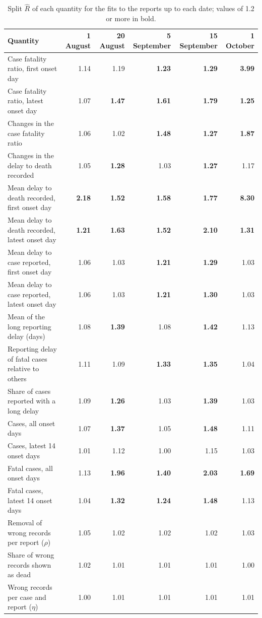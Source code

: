 \documentclass[11pt,a4paper]{article}
\begin{document}
\begin{table}[p]
\centering
\small
\begin{tabular}{lrrrrr}
\toprule
Quantity & 1 August & 20 August & 5 September & 15 September & 1 October\\
\midrule
Case fatality ratio, first onset day & 1.14 & 1.19 & \textbf{1.23} & \textbf{1.29} & \textbf{3.99} \\
Case fatality ratio, latest onset day & 1.07 & \textbf{1.47} & \textbf{1.61} & \textbf{1.79} & \textbf{1.25} \\
Changes in the case fatality ratio & 1.06 & 1.02 & \textbf{1.48} & \textbf{1.27} & \textbf{1.87} \\
Changes in the delay to death recorded & 1.05 & \textbf{1.28} & 1.03 & \textbf{1.27} & 1.17 \\
Mean delay to death recorded, first onset day & \textbf{2.18} & \textbf{1.52} & \textbf{1.58} & \textbf{1.77} & \textbf{8.30} \\
Mean delay to death recorded, latest onset day & \textbf{1.21} & \textbf{1.63} & \textbf{1.52} & \textbf{2.10} & \textbf{1.31} \\
Mean delay to case reported, first onset day & 1.06 & 1.03 & \textbf{1.21} & \textbf{1.29} & 1.03 \\
Mean delay to case reported, latest onset day & 1.06 & 1.03 & \textbf{1.21} & \textbf{1.30} & 1.03 \\
Mean of the long reporting delay (days) & 1.08 & \textbf{1.39} & 1.08 & \textbf{1.42} & 1.13 \\
Reporting delay of fatal cases relative to others & 1.11 & 1.09 & \textbf{1.33} & \textbf{1.35} & 1.04 \\
Share of cases reported with a long delay & 1.09 & \textbf{1.26} & 1.03 & \textbf{1.39} & 1.03 \\
Cases, all onset days & 1.07 & \textbf{1.37} & 1.05 & \textbf{1.48} & 1.11 \\
Cases, latest 14 onset days & 1.01 & 1.12 & 1.00 & 1.15 & 1.03 \\
Fatal cases, all onset days & 1.13 & \textbf{1.96} & \textbf{1.40} & \textbf{2.03} & \textbf{1.69} \\
Fatal cases, latest 14 onset days & 1.04 & \textbf{1.32} & \textbf{1.24} & \textbf{1.48} & 1.13 \\
Removal of wrong records per report ($\rho$) & 1.05 & 1.02 & 1.02 & 1.02 & 1.03 \\
Share of wrong records shown as dead & 1.02 & 1.01 & 1.01 & 1.01 & 1.00 \\
Wrong records per case and report ($\eta$) & 1.00 & 1.01 & 1.01 & 1.01 & 1.01 \\
\bottomrule
\end{tabular}
\caption{Split $\hat{R}$ of each quantity for the fits to the reports up to each date; values of 1.2 or more in bold.}
\label{tab:nowcastallrhat}
\end{table}
\end{document}
